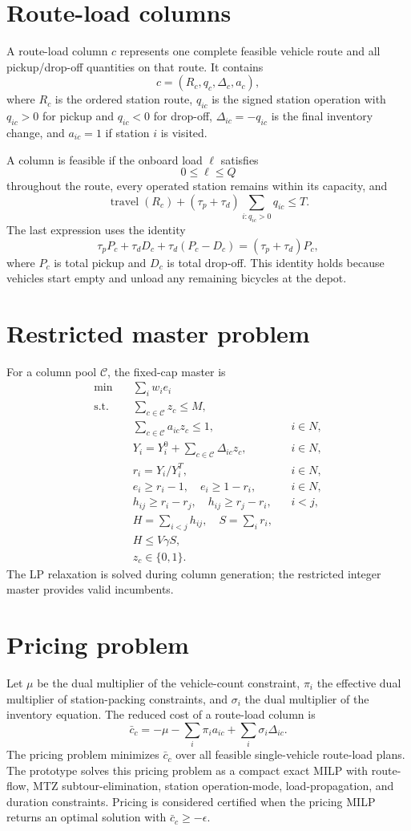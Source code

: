 \documentclass[11pt]{article}
\begin{document}
\section{Route-load columns}
A route-load column $c$ represents one complete feasible vehicle route and all pickup/drop-off quantities on that route.  It contains
\[
 c=(R_c,q_c,\Delta_c,a_c),
\]
where $R_c$ is the ordered station route, $q_{ic}$ is the signed station operation with $q_{ic}>0$ for pickup and $q_{ic}<0$ for drop-off, $\Delta_{ic}=-q_{ic}$ is the final inventory change, and $a_{ic}=1$ if station $i$ is visited.

A column is feasible if the onboard load $\ell$ satisfies
\[
 0\le \ell\le Q
\]
throughout the route, every operated station remains within its capacity, and
\[
 \operatorname{travel}(R_c)+(\tau_p+\tau_d)\sum_{i:q_{ic}>0}q_{ic}\le T.
\]
The last expression uses the identity
\[
 \tau_p P_c+\tau_d D_c+\tau_d(P_c-D_c)=(\tau_p+\tau_d)P_c,
\]
where $P_c$ is total pickup and $D_c$ is total drop-off.  This identity holds because vehicles start empty and unload any remaining bicycles at the depot.

\section{Restricted master problem}
For a column pool $\mathcal C$, the fixed-cap master is
\begin{align}
\min\quad & \sum_i w_i e_i \\
\text{s.t.}\quad
& \sum_{c\in\mathcal C} z_c \le M,\\
& \sum_{c\in\mathcal C} a_{ic}z_c\le 1, && i\in N,\\
& Y_i=Y_i^0+\sum_{c\in\mathcal C}\Delta_{ic}z_c, && i\in N,\\
& r_i=Y_i/Y_i^T, && i\in N,\\
& e_i\ge r_i-1,
\quad e_i\ge 1-r_i, && i\in N,\\
& h_{ij}\ge r_i-r_j,
\quad h_{ij}\ge r_j-r_i, && i<j,\\
& H=\sum_{i<j}h_{ij},
\quad S=\sum_i r_i,\\
& H\le V\gamma S,\\
& z_c\in\{0,1\}. 
\end{align}
The LP relaxation is solved during column generation; the restricted integer master provides valid incumbents.

\section{Pricing problem}
Let $\mu$ be the dual multiplier of the vehicle-count constraint, $\pi_i$ the effective dual multiplier of station-packing constraints, and $\sigma_i$ the dual multiplier of the inventory equation.  The reduced cost of a route-load column is
\[
 \bar c_c=-\mu-\sum_i\pi_i a_{ic}+\sum_i\sigma_i\Delta_{ic}.
\]
The pricing problem minimizes $\bar c_c$ over all feasible single-vehicle route-load plans.  The prototype solves this pricing problem as a compact exact MILP with route-flow, MTZ subtour-elimination, station operation-mode, load-propagation, and duration constraints.  Pricing is considered certified when the pricing MILP returns an optimal solution with $\bar c_c\ge -\epsilon$.
\end{document}
